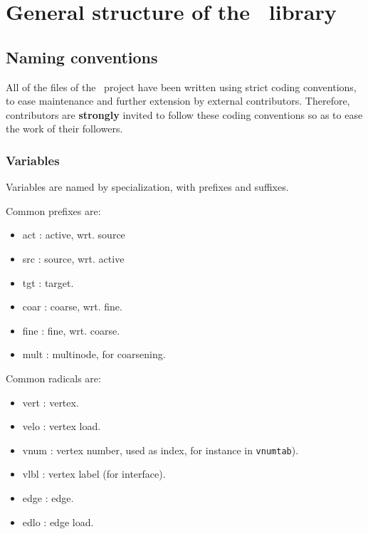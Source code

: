 
\section{General structure of the \libscotch\ library}
\label{sec-structure}

\subsection{Naming conventions}

All of the files of the \scotch\ project have been written using
strict coding conventions, to ease maintenance and further extension
by external contributors. Therefore, contributors are {\bf strongly}
invited to follow these coding conventions so as to ease the work of
their followers.

\subsubsection{Variables}

Variables are named by specialization, with prefixes and suffixes.

Common prefixes are:
\begin{itemize}
\item
act : active, wrt. source
\item
src : source, wrt. active
\item
tgt : target.
\item
coar : coarse, wrt. fine.
\item
fine : fine, wrt. coarse.
\item
mult : multinode, for coarsening.
\end{itemize}

Common radicals are:
\begin{itemize}
\item
vert : vertex.
\item
velo : vertex load.
\item
vnum : vertex number, used as index, for instance in {\tt vnumtab}).
\item
vlbl : vertex label (for interface).
\item
edge : edge.
\item
edlo : edge load.
\end{itemize}

